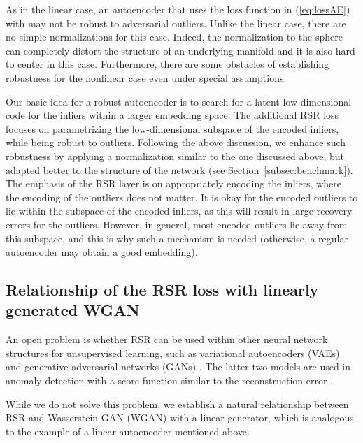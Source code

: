 \documentclass{article} \usepackage{iclr2020_conference,times}
\def\Secref#1{Section~\ref{#1}}
\def\eqref#1{(\ref{#1})}
\begin{document}
As in the linear case, an autoencoder that uses the loss function in \eqref{eq:lossAE} with  may not be robust to adversarial outliers. Unlike the linear case, there are no simple normalizations for this case. Indeed, the normalization to the sphere can completely distort the structure of an underlying manifold and it is also hard to center in this case. Furthermore, there are some obstacles of establishing robustness for the nonlinear case even under special assumptions. 

Our basic idea for a robust autoencoder is to search for a latent low-dimensional code for the inliers within a larger embedding space. The additional RSR loss focuses on parametrizing the low-dimensional subspace of the encoded inliers, while being robust to outliers. 
Following the above discussion, we enhance such robustness by applying a normalization similar to the one discussed above, but adapted better to the structure of the network (see \Secref{subsec:benchmark}). 
The emphasis of the RSR layer is on appropriately encoding the inliers, where the encoding of the outliers does not matter.  It is okay for the encoded outliers to lie within the subspace of the encoded inliers, as this will result in large recovery errors for the outliers. However, in general, most encoded outliers lie away from this subspace, and this is why such a mechanism is needed (otherwise, a regular autoencoder may obtain a good embedding). 



\subsection{Relationship of the RSR loss with linearly generated WGAN}
\label{sec:generative}

An open problem is whether RSR can be used within other neural network structures for unsupervised learning, such as variational autoencoders (VAEs) \citep{kingma2013auto} and generative adversarial networks (GANs) \citep{goodfellow2014generative}. The latter two models are used in anomaly detection with a score function similar to the reconstruction error \citep{an2015variational,vasilev2018q,zenati2018efficient,kliger2018novelty}.


While we do not solve this problem, we establish a natural relationship between RSR and Wasserstein-GAN (WGAN) \citep{arjovsky2017wasserstein, gulrajani2017improved} with a linear generator, which is analogous to the example of a linear autoencoder mentioned above. 
\end{document}
